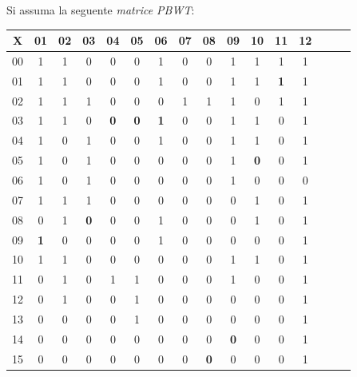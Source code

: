 \begin{esempio}
  Si assuma la seguente \textit{matrice PBWT}:
  \begin{table}[H]
    \centering
    \footnotesize
    \begin{tabular}{c|ccccccccccccccc}
      X & 01 & 02 & 03 & 04 & 05 & 06 & 07 & 08 & 09 & 10 & 11 & 12 \\
      \hline
      00 & 1 & 1 & 0 & 0 & 0 & 1 & 0 & 0 & 1 & 1 & 1 & 1 \\
      01 & 1 & 1 & 0 & 0 & 0 & 1 & 0 & 0 & 1 & 1 & {\color{nordred}\textbf{1}}
                                                               & 1 \\
      02 & 1 & 1 & 1 & 0 & 0 & 0 & 1 & 1 & 1 & 0 & 1 & 1 \\
      03 & 1 & 1 & 0 & {\color{nordred}\textbf{0}} & {\color{nordred}\textbf{0}}
                                 & {\color{nordred}\textbf{1}} & 0 & 0 & 1 & 1
                                                          & 0 & 1 \\
      04 & 1 & 0 & 1 & 0 & 0 & 1 & 0 & 0 & 1 & 1 & 0 & 1 \\
      05 & 1 & 0 & 1 & 0 & 0 & 0 & 0 & 0 & 1 & {\color{nordred}\textbf{0}} & 0
                                                               & 1 \\
      06 & 1 & 0 & 1 & 0 & 0 & 0 & 0 & 0 & 1 & 0 & 0 & 0 \\
      07 & 1 & 1 & 1 & 0 & 0 & 0 & 0 & 0 & 0 & 1 & 0 & 1 \\
      08 & 0 & 1 & {\color{nordred}\textbf{0}} & 0 & 0 & 1 & 0 & 0 & 0 & 1 & 0
                                                               & 1 \\
      09 & {\color{nordred}\textbf{1}} & 0 & 0 & 0 & 0 & 1 & 0 & 0 & 0 & 0 & 0
                                                               & 1 \\
      10 & 1 & 1 & 0 & 0 & 0 & 0 & 0 & 0 & 1 & 1 & 0 & 1 \\
      11 & 0 & 1 & 0 & 1 & 1 & 0 & 0 & 0 & 1 & 0 & 0 & 1 \\
      12 & 0 & 1 & 0 & 0 & 1 & 0 & 0 & 0 & 0 & 0 & 0 & 1 \\
      13 & 0 & 0 & 0 & 0 & 1 & 0 & 0 & 0 & 0 & 0 & 0 & 1 \\
      14 & 0 & 0 & 0 & 0 & 0 & 0 & 0 & 0 & {\color{nordred}\textbf{0}} & 0 & 0
                                                               & 1 \\
      15 & 0 & 0 & 0 & 0 & 0 & 0 & 0 & {\color{nordred}\textbf{0}} & 0 & 0 & 0
                                                               & 1 \\

\end{tabular}
\end{table}
\end{esempio}
